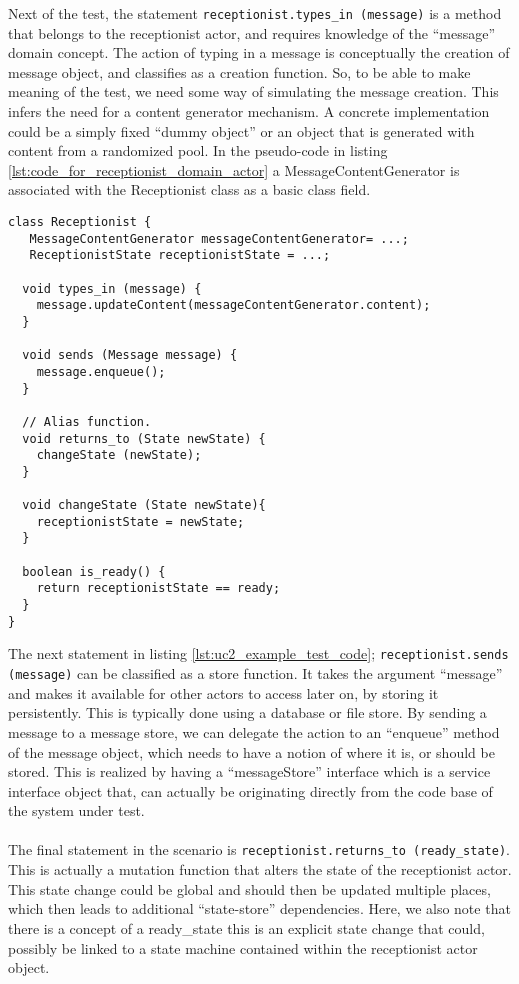 Next of the test, the statement \texttt{receptionist.types\_in~(message)} is a method that belongs to the receptionist actor, and requires knowledge of the ``message'' domain concept. The action of typing in a message is conceptually the creation of message object, and classifies as a creation function. So, to be able to make meaning of the test, we need some way of simulating the message creation. This infers the need for a content generator mechanism. A concrete implementation could be a simply fixed ``dummy object'' or an object that is generated with content from a randomized pool. In the pseudo-code in listing \ref{lst:code_for_receptionist_domain_actor} a MessageContentGenerator is associated with the Receptionist class as a basic class field.
\begin{lstlisting}[style=Dart, caption=Pseudo code representing Receptionist domain actor,label={lst:code_for_receptionist_domain_actor}]
class Receptionist {
   MessageContentGenerator messageContentGenerator= ...;
   ReceptionistState receptionistState = ...;
  
  void types_in (message) {
  	message.updateContent(messageContentGenerator.content);
  }
  
  void sends (Message message) {
    message.enqueue();
  }
  
  // Alias function.
  void returns_to (State newState) {
  	changeState (newState);
  }
  
  void changeState (State newState){
  	receptionistState = newState;
  }
  
  boolean is_ready() {
    return receptionistState == ready;
  }
}
\end{lstlisting}
The next statement in listing \ref{lst:uc2_example_test_code}; \texttt{receptionist.sends (message)} can be classified as a store function. It takes the argument ``message'' and makes it available for other actors to access later on, by storing it persistently. This is typically done using a database or file store. By sending a message to a message store, we can delegate the action to an ``enqueue'' method of the message object, which needs to have a notion of where it is, or should be stored. This is realized by having a ``messageStore'' interface which is a service interface object that, can actually be originating directly from the code base of the system under test.\\\\
The final statement in the scenario is \texttt{receptionist.returns\_to (ready\_state)}. This is actually a mutation function that alters the state of the receptionist actor. This state change could be global and should then  be updated multiple places, which then leads to additional ``state-store'' dependencies. Here, we also note that there is a concept of a ready\_state this is an explicit state change that could, possibly be linked to a state machine contained within the receptionist actor object.\\\\
